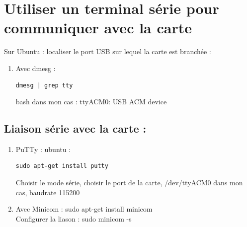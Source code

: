 \documentclass{article}
\begin{document}
\begin{itemize}
\begin{enumerate}
     
   
\end{enumerate}



\section{Utiliser un terminal série pour communiquer avec la carte}


Sur Ubuntu :
localiser le port USB sur lequel la carte est branchée : 
\begin{enumerate}



\item Avec dmesg :


\begin{verbatim}
dmesg | grep tty 
\end{verbatim}{bash}
dans mon cas : ttyACM0: USB ACM device




\end{enumerate}

\subsection{Liaison série avec la carte :}

\begin{enumerate}



\item PuTTy : ubuntu : 
\begin{verbatim}
sudo apt-get install putty
\end{verbatim}
Choisir le mode série, choisir le port de la carte, /dev/ttyACM0 dans mon cas, baudrate 115200

\item
Avec Minicom : sudo apt-get install minicom \\
Configurer la liason : sudo minicom -s


\end{enumerate}
\end{itemize}
\end{document}
